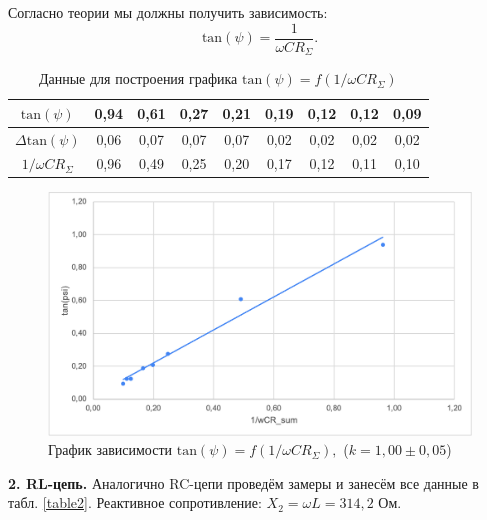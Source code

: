 \documentclass[a4paper, 12pt]{article}
\begin{document}
    Согласно теории мы должны получить зависимость:
    \begin{equation}
        \mathrm{tan}(\psi) = \frac{1}{\omega C R_{\Sigma}}.
    \end{equation}
    
    \begin{table}[ht]
        \centering
        \begin{tabular}{|c|c|c|c|c|c|c|c|c|}
            \hline
            $\mathrm{tan}(\psi)$ & 0,94 & 0,61 & 0,27 & 0,21 & 0,19 & 0,12 & 0,12 & 0,09 \\
            \hline
            $\Delta \mathrm{tan}(\psi)$ & 0,06 & 0,07 & 0,07 & 0,07 & 0,02 & 0,02 & 0,02 & 0,02 \\
            \hline
            $1/\omega C R_{\Sigma}$ & 0,96 & 0,49 & 0,25 & 0,20 & 0,17 & 0,12 & 0,11 & 0,10 \\
            \hline
        \end{tabular}
        \caption{Данные для построения графика $\mathrm{tan}(\psi) = f(1/\omega C R_{\Sigma})$}
    \end{table}
    
    \begin{figure}[ht]
        \centering
        \includegraphics[width=0.79\linewidth]{images/RC-graph.png}
        \caption{График зависимости $\mathrm{tan}(\psi) = f(1/\omega C R_{\Sigma}),$ ($k = 1,00 \pm 0,05$)}
    \end{figure}
    
    \newpage
    
    {\bf 2. RL-цепь.} Аналогично RC-цепи проведём замеры и занесём все данные в табл. \ref{table2}. Реактивное сопротивление: $X_2 = \omega L = 314,2 \text{ Ом}$.
    
\end{document}
